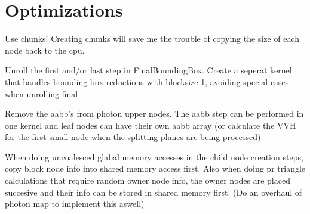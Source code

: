\chapter{Optimizations}

Use chunks! Creating chunks will save me the trouble of copying the
size of each node back to the cpu.

Unroll the first and/or last step in FinalBoundingBox. Create a
seperat kernel that handles bounding box reductions with blocksize 1,
avoiding special cases when unrolling final

Remove the aabb's from photon upper nodes. The aabb step can be
performed in one kernel and leaf nodes can have their own aabb array
(or calculate the VVH for the first small node when the splitting
planes are being processed)

When doing uncoalesced glabal memory accesses in the child node
creation steps, copy block node info into shared memory access first.
Also when doing pr triangle calculations that require random owner
node info, the owner nodes are placed succesive and their info can be
stored in shared memory first. (Do an overhaul of photon map to
implement this aswell)
